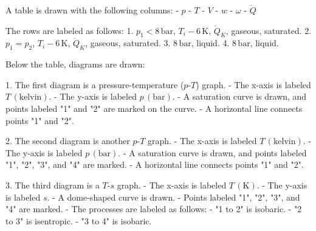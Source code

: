A table is drawn with the following columns:  
- \( p \)  
- \( T \)  
- \( V \)  
- \( w \)  
- \( \omega \)  
- \( \dot{Q} \)  

The rows are labeled as follows:  
1. \( p_1 < 8 \, \text{bar} \), \( T_i - 6 \, \text{K} \), \( \dot{Q}_K \), gaseous, saturated.  
2. \( p_1 = p_2 \), \( T_i - 6 \, \text{K} \), \( \dot{Q}_K \), gaseous, saturated.  
3. \( 8 \, \text{bar} \), liquid.  
4. \( 8 \, \text{bar} \), liquid.  

Below the table, diagrams are drawn:  

1. The first diagram is a pressure-temperature (\( p \)-\( T \)) graph.  
   - The x-axis is labeled \( T \, (\text{kelvin}) \).  
   - The y-axis is labeled \( p \, (\text{bar}) \).  
   - A saturation curve is drawn, and points labeled "1" and "2" are marked on the curve.  
   - A horizontal line connects points "1" and "2".  

2. The second diagram is another \( p \)-\( T \) graph.  
   - The x-axis is labeled \( T \, (\text{kelvin}) \).  
   - The y-axis is labeled \( p \, (\text{bar}) \).  
   - A saturation curve is drawn, and points labeled "1", "2", "3", and "4" are marked.  
   - A horizontal line connects points "1" and "2".  

3. The third diagram is a \( T \)-\( s \) graph.  
   - The x-axis is labeled \( T \, (\text{K}) \).  
   - The y-axis is labeled \( s \).  
   - A dome-shaped curve is drawn.  
   - Points labeled "1", "2", "3", and "4" are marked.  
   - The processes are labeled as follows:  
     - "1 to 2" is isobaric.  
     - "2 to 3" is isentropic.  
     - "3 to 4" is isobaric.